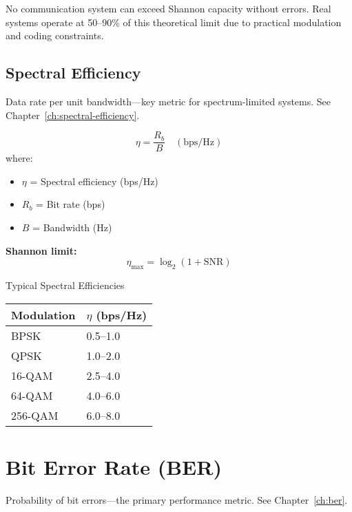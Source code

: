 \begin{warningbox}
No communication system can exceed Shannon capacity without errors. Real systems operate at 50--90\% of this theoretical limit due to practical modulation and coding constraints.
\end{warningbox}

\subsection{Spectral Efficiency}
\label{sec:spectral-efficiency}

Data rate per unit bandwidth---key metric for spectrum-limited systems. See Chapter~\ref{ch:spectral-efficiency}.

\begin{equation}
\eta = \frac{R_b}{B} \quad (\text{bps/Hz})
\label{eq:spectral-efficiency}
\end{equation}
where:
\begin{itemize}
\item $\eta$ = Spectral efficiency (bps/Hz)
\item $R_b$ = Bit rate (bps)
\item $B$ = Bandwidth (Hz)
\end{itemize}

\textbf{Shannon limit:}
\begin{equation}
\eta_{\max} = \log_2(1 + \text{SNR})
\label{eq:shannon-limit}
\end{equation}

\begin{calloutbox}{Typical Spectral Efficiencies}
\begin{tabular}{@{}ll@{}}
\toprule
Modulation & $\eta$ (bps/Hz) \\
\midrule
BPSK & 0.5--1.0 \\
QPSK & 1.0--2.0 \\
16-QAM & 2.5--4.0 \\
64-QAM & 4.0--6.0 \\
256-QAM & 6.0--8.0 \\
\bottomrule
\end{tabular}
\end{calloutbox}

\section{Bit Error Rate (BER)}
\label{sec:ber}

Probability of bit errors---the primary performance metric. See Chapter~\ref{ch:ber}.

